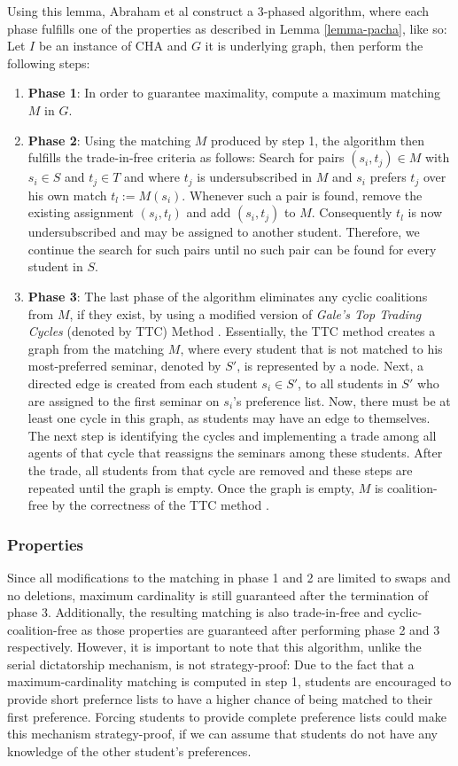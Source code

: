 Using this lemma, Abraham et al \cite{Abraham:Pacha} construct a 3-phased algorithm, where each phase fulfills one of the properties as described in Lemma \ref{lemma-pacha}, like so: Let $I$ be an instance of CHA and $G$ it is underlying graph, then perform the following steps:
\begin{enumerate}
    \item \textbf{Phase 1}: In order to guarantee maximality, compute a maximum matching $M$ in $G$.
    \item \textbf{Phase 2}: Using the matching $M$ produced by step 1, the algorithm then fulfills the trade-in-free criteria as follows: Search for pairs $(s_i, t_j) \in M$ with $s_i \in S$ and $t_j \in T$ and where $t_j$ is undersubscribed in $M$ and $s_i$ prefers $t_j$ over his own match $t_l := M(s_i)$. Whenever such a pair is found, remove the existing assignment $(s_i, t_l)$ and add $(s_i, t_j)$ to $M$. Consequently $t_l$ is now undersubscribed and may be assigned to another student. Therefore, we continue the search for such pairs until no such pair can be found for every student in $S$.
    \item \textbf{Phase 3}: The last phase of the algorithm eliminates any cyclic coalitions from $M$, if they exist, by using a modified version of \emph{Gale's Top Trading Cycles} (denoted by TTC) Method \cite{ShapleyTTC}. Essentially, the TTC method creates a graph from the matching $M$, where every student that is not matched to his most-preferred seminar, denoted by $S'$, is represented by a node. Next, a directed edge is created from each student $s_i \in S'$, to all students in $S'$ who are assigned to the first seminar on $s_i$'s preference list. Now, there must be at least one cycle in this graph, as students may have an edge to themselves. The next step is identifying the cycles and implementing a trade among all agents of that cycle that reassigns the seminars among these students. After the trade, all students from that cycle are removed and these steps are repeated until the graph is empty. Once the graph is empty, $M$ is coalition-free by the correctness of the TTC method \cite{Abraham:Pacha}.
\end{enumerate}

\subsubsection{Properties}
Since all modifications to the matching in phase 1 and 2 are limited to swaps and no deletions, maximum cardinality is still guaranteed after the termination of phase 3. Additionally, the resulting matching is also trade-in-free and cyclic-coalition-free as those properties are guaranteed after performing phase 2 and 3 respectively. However, it is important to note that this algorithm, unlike the serial dictatorship mechanism, is not strategy-proof: Due to the fact that a maximum-cardinality matching is computed in step 1, students are encouraged to provide short prefernce lists to have a higher chance of being matched to their first preference. Forcing students to provide complete preference lists could make this mechanism strategy-proof, if we can assume that students do not have any knowledge of the other student's preferences.

